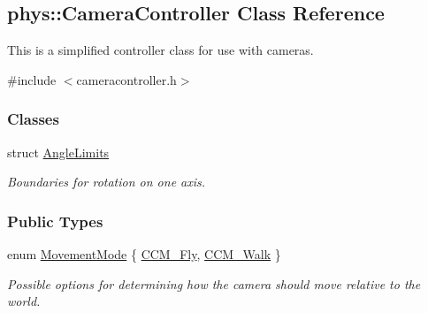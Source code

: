 \hypertarget{classphys_1_1CameraController}{
\subsection{phys::CameraController Class Reference}
\label{classphys_1_1CameraController}
}


This is a simplified controller class for use with cameras.  




{\ttfamily \#include $<$cameracontroller.h$>$}

\subsubsection*{Classes}
\begin{DoxyCompactItemize}
\item 
struct \hyperlink{structphys_1_1CameraController_1_1AngleLimits}{AngleLimits}
\begin{DoxyCompactList}\small\item\em Boundaries for rotation on one axis. \item\end{DoxyCompactList}\end{DoxyCompactItemize}
\subsubsection*{Public Types}
\begin{DoxyCompactItemize}
\item 
enum \hyperlink{classphys_1_1CameraController_af7ea701f4b768a0335e8e0115d516af8}{MovementMode} \{ \hyperlink{classphys_1_1CameraController_af7ea701f4b768a0335e8e0115d516af8a0a4e9439e82433de1e7280332f52f26d}{CCM\_\-Fly}, 
\hyperlink{classphys_1_1CameraController_af7ea701f4b768a0335e8e0115d516af8a237d443454262ada472562d7385badac}{CCM\_\-Walk}
 \}
\begin{DoxyCompactList}\small\item\em Possible options for determining how the camera should move relative to the world. \item\end{DoxyCompactList}\end{DoxyCompactItemize}
